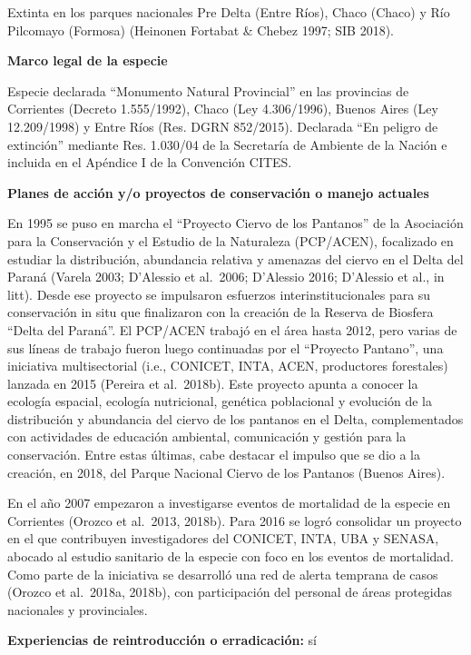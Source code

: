 \documentclass[
  x11names]{article}
\begin{document}
Extinta en los parques nacionales Pre Delta (Entre Ríos), Chaco (Chaco)
y Río Pilcomayo (Formosa) (Heinonen Fortabat \& Chebez 1997; SIB 2018).

\textbf{Marco legal de la especie}

Especie declarada ``Monumento Natural Provincial'' en las provincias de
Corrientes (Decreto 1.555/1992), Chaco (Ley 4.306/1996), Buenos Aires
(Ley 12.209/1998) y Entre Ríos (Res. DGRN 852/2015). Declarada ``En
peligro de extinción'' mediante Res. 1.030/04 de la Secretaría de
Ambiente de la Nación e incluida en el Apéndice I de la Convención
CITES.

\textbf{Planes de acción y/o proyectos de conservación o manejo
actuales}

En 1995 se puso en marcha el ``Proyecto Ciervo de los Pantanos'' de la
Asociación para la Conservación y el Estudio de la Naturaleza
(PCP/ACEN), focalizado en estudiar la distribución, abundancia relativa
y amenazas del ciervo en el Delta del Paraná (Varela 2003; D'Alessio et
al.~2006; D'Alessio 2016; D'Alessio et al., in litt). Desde ese proyecto
se impulsaron esfuerzos interinstitucionales para su conservación in
situ que finalizaron con la creación de la Reserva de Biosfera ``Delta
del Paraná''. El PCP/ACEN trabajó en el área hasta 2012, pero varias de
sus líneas de trabajo fueron luego continuadas por el ``Proyecto
Pantano'', una iniciativa multisectorial (i.e., CONICET, INTA, ACEN,
productores forestales) lanzada en 2015 (Pereira et al.~2018b). Este
proyecto apunta a conocer la ecología espacial, ecología nutricional,
genética poblacional y evolución de la distribución y abundancia del
ciervo de los pantanos en el Delta, complementados con actividades de
educación ambiental, comunicación y gestión para la conservación. Entre
estas últimas, cabe destacar el impulso que se dio a la creación, en
2018, del Parque Nacional Ciervo de los Pantanos (Buenos Aires).

En el año 2007 empezaron a investigarse eventos de mortalidad de la
especie en Corrientes (Orozco et al.~2013, 2018b). Para 2016 se logró
consolidar un proyecto en el que contribuyen investigadores del CONICET,
INTA, UBA y SENASA, abocado al estudio sanitario de la especie con foco
en los eventos de mortalidad. Como parte de la iniciativa se desarrolló
una red de alerta temprana de casos (Orozco et al.~2018a, 2018b), con
participación del personal de áreas protegidas nacionales y
provinciales.

\textbf{Experiencias de reintroducción o erradicación:} sí
\end{document}
